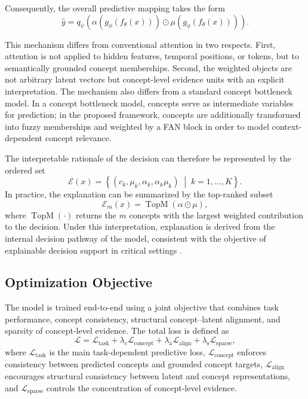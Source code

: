 \documentclass[runningheads]{llncs}
\begin{document}
Consequently, the overall predictive mapping takes the form
\begin{equation}
\hat{y}
=
q_{\psi}\!\left(
\alpha(g_{\phi}(f_{\theta}(x))) \odot
\mu(g_{\phi}(f_{\theta}(x)))
\right).
\end{equation}

This mechanism differs from conventional attention in two respects. First, attention is not applied to hidden features, temporal positions, or tokens, but to semantically grounded concept memberships. Second, the weighted objects are not arbitrary latent vectors but concept-level evidence units with an explicit interpretation. The mechanism also differs from a standard concept bottleneck model. In a concept bottleneck model, concepts serve as intermediate variables for prediction; in the proposed framework, concepts are additionally transformed into fuzzy memberships and weighted by a FAN block in order to model context-dependent concept relevance.

The interpretable rationale of the decision can therefore be represented by the ordered set
\begin{equation}
\mathcal{E}(x) =
\left\{
(c_k,\mu_k,\alpha_k,\alpha_k\mu_k)
\;\middle|\;
k=1,\dots,K
\right\}.
\end{equation}
In practice, the explanation can be summarized by the top-ranked subset
\begin{equation}
\mathcal{E}_{m}(x)
=
\operatorname{TopM}\left(\alpha \odot \mu\right),
\end{equation}
where $\operatorname{TopM}(\cdot)$ returns the $m$ concepts with the largest weighted contribution to the decision. Under this interpretation, explanation is derived from the internal decision pathway of the model, consistent with the objective of explainable decision support in critical settings \cite{schwalbe2024criticalxai}.

\subsection{Optimization Objective}

The model is trained end-to-end using a joint objective that combines task performance, concept consistency, structural concept--latent alignment, and sparsity of concept-level evidence. The total loss is defined as
\begin{equation}
\mathcal{L}
=
\mathcal{L}_{\mathrm{task}}
+
\lambda_{\mathrm{c}}\mathcal{L}_{\mathrm{concept}}
+
\lambda_{\mathrm{a}}\mathcal{L}_{\mathrm{align}}
+
\lambda_{\mathrm{s}}\mathcal{L}_{\mathrm{sparse}},
\end{equation}
where $\mathcal{L}_{\mathrm{task}}$ is the main task-dependent predictive loss, $\mathcal{L}_{\mathrm{concept}}$ enforces consistency between predicted concepts and grounded concept targets, $\mathcal{L}_{\mathrm{align}}$ encourages structural consistency between latent and concept representations, and $\mathcal{L}_{\mathrm{sparse}}$ controls the concentration of concept-level evidence.
\end{document}
